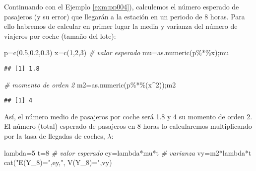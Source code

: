 \documentclass[
]{book}
\newenvironment{Shaded}{\begin{snugshade}}{\end{snugshade}}
\newcommand{\CommentTok}[1]{\textcolor[rgb]{0.56,0.35,0.01}{\textit{#1}}}
\newcommand{\DecValTok}[1]{\textcolor[rgb]{0.00,0.00,0.81}{#1}}
\newcommand{\FloatTok}[1]{\textcolor[rgb]{0.00,0.00,0.81}{#1}}
\newcommand{\FunctionTok}[1]{\textcolor[rgb]{0.00,0.00,0.00}{#1}}
\newcommand{\NormalTok}[1]{#1}
\newcommand{\OtherTok}[1]{\textcolor[rgb]{0.56,0.35,0.01}{#1}}
\newcommand{\SpecialCharTok}[1]{\textcolor[rgb]{0.00,0.00,0.00}{#1}}
\newcommand{\StringTok}[1]{\textcolor[rgb]{0.31,0.60,0.02}{#1}}
\theoremstyle{definition}
\theoremstyle{definition}
\theoremstyle{definition}
\theoremstyle{definition}
\theoremstyle{remark}
\begin{document}
Continuando con el Ejemplo \ref{exm:pp004}), calculemos el número esperado de pasajeros (y su error) que llegarán a la estación en un periodo de 8 horas. Para ello habremos de calcular en primer lugar la media y varianza del número de viajeros por coche (tamaño del lote):

\begin{Shaded}
\begin{Highlighting}[]
\NormalTok{p}\OtherTok{=}\FunctionTok{c}\NormalTok{(}\FloatTok{0.5}\NormalTok{,}\FloatTok{0.2}\NormalTok{,}\FloatTok{0.3}\NormalTok{)}
\NormalTok{x}\OtherTok{=}\FunctionTok{c}\NormalTok{(}\DecValTok{1}\NormalTok{,}\DecValTok{2}\NormalTok{,}\DecValTok{3}\NormalTok{)}
\CommentTok{\# valor esperado}
\NormalTok{mu}\OtherTok{=}\FunctionTok{as.numeric}\NormalTok{(p}\SpecialCharTok{\%*\%}\NormalTok{x);mu}
\end{Highlighting}
\end{Shaded}

\begin{verbatim}
## [1] 1.8
\end{verbatim}

\begin{Shaded}
\begin{Highlighting}[]
\CommentTok{\# momento de orden 2}
\NormalTok{m2}\OtherTok{=}\FunctionTok{as.numeric}\NormalTok{(p}\SpecialCharTok{\%*\%}\NormalTok{(x}\SpecialCharTok{\^{}}\DecValTok{2}\NormalTok{));m2}
\end{Highlighting}
\end{Shaded}

\begin{verbatim}
## [1] 4
\end{verbatim}

Así, el número medio de pasajeros por coche será 1.8 y 4 su momento de orden 2. El número (total) esperado de pasajeros en 8 horas lo calcularemos multiplicando por la tasa de llegadas de coches, \(\lambda\):

\begin{Shaded}
\begin{Highlighting}[]
\NormalTok{lambda}\OtherTok{=}\DecValTok{5}
\NormalTok{t}\OtherTok{=}\DecValTok{8}
\CommentTok{\# valor esperado}
\NormalTok{ey}\OtherTok{=}\NormalTok{lambda}\SpecialCharTok{*}\NormalTok{mu}\SpecialCharTok{*}\NormalTok{t}
\CommentTok{\# varianza}
\NormalTok{vy}\OtherTok{=}\NormalTok{m2}\SpecialCharTok{*}\NormalTok{lambda}\SpecialCharTok{*}\NormalTok{t}
\FunctionTok{cat}\NormalTok{(}\StringTok{"E(Y\_8)="}\NormalTok{,ey,}\StringTok{", V(Y\_8)="}\NormalTok{,vy)}
\end{Highlighting}
\end{Shaded}
\end{document}
